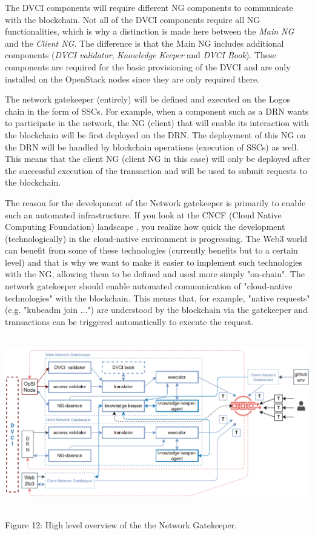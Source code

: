 \documentclass[]{article}
\begin{document}
The DVCI components will require different NG components to communicate with the blockchain.   
Not all of the DVCI components require all NG functionalities, which is why a distinction is made here between the \textit{Main NG} and the \textit{Client NG}.
The difference is that the Main NG includes additional components (\textit{DVCI validator}, \textit{Knowledge Keeper} and \textit{DVCI Book}). 
These components are required for the basic provisioning of the DVCI and are only installed on the OpenStack nodes since they are only required there.

The network gatekeeper (entirely) will be defined and executed on the Logos chain in the form of SSCs.
For example, when a component such as a DRN wants to participate in the network, the NG (client) that will enable its interaction with the blockchain will be first deployed on the DRN. 
The deployment of this NG on the DRN will be handled by blockchain operations (execution of SSCs) as well. 
This means that the client NG (client NG in this case) will only be deployed after the successful execution of the transaction and will be used to submit requests to the blockchain.

The reason for the development of the Network gatekeeper is primarily to enable such an automated infrastructure.
If you look at the CNCF (Cloud Native Computing Foundation) landscape \cite{cncf-land}, you realize how quick the development (technologically) in the cloud-native environment is progressing. 
The Web3 world can benefit from some of these technologies (currently benefits but to a certain level) and that is why we want to make it easier to implement such technologies with the NG, allowing them to be defined and used more simply "on-chain".
The network gatekeeper should enable automated communication of "cloud-native technologies" with the blockchain. 
This means that, for example, "native requests" (e.g. "kubeadm join ...") are understood by the blockchain via the gatekeeper and transactions can be triggered automatically to execute the request.

\begin{center}
	\includegraphics[height=7.5cm]{network-gatekeeper}
\end{center}
\begin{center}
	Figure 12: High level overview of the the Network Gatekeeper.
\end{center}
\end{document}
